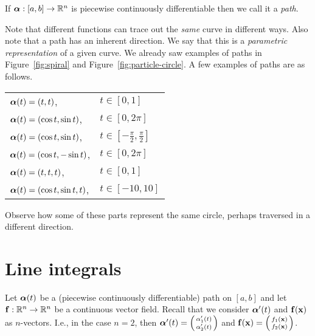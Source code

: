 \begin{definition}%
    \label{def:path}
    If \(\boldsymbol{\alpha}: [a,b] \to \mathbb{R}^n\) is piecewise continuously differentiable then we call it a \emph{path}.
\end{definition}

Note that different functions can trace out the \emph{same} curve in different ways.
Also note that a path has an inherent direction.
We say that this is a \emph{parametric representation} of a given curve.
We already saw examples of paths in Figure~\ref{fig:spiral} and Figure~\ref{fig:particle-circle}.
A few examples of paths are as follows.

\begin{center}
    \begin{tabular}{l l}
        \(\boldsymbol{\alpha}(t)= (t,t)\),              & \(t\in[0,1]\)                           \\
        \(\boldsymbol{\alpha}(t) = (\cos t, \sin t)\),  & \(t\in[0,2\pi]\)                        \\
        \(\boldsymbol{\alpha}(t) = (\cos t, \sin t)\),  & \(t\in [-\frac{\pi}{2},\frac{\pi}{2}]\) \\
        \(\boldsymbol{\alpha}(t) = (\cos t, -\sin t)\), & \(t\in[0,2\pi]\)                        \\
        \(\boldsymbol{\alpha}(t)= (t,t,t)\),            & \(t\in[0,1]\)                           \\
        \(\boldsymbol{\alpha}(t)=(\cos t, \sin t, t)\), & \(t\in [-10,10]\)
    \end{tabular}
\end{center}
\noindent
Observe how some of these parts represent the same circle, perhaps traversed in a different direction.

\section{Line integrals}
Let \(\boldsymbol{\alpha}(t)\) be a (piecewise continuously differentiable) path on \([a,b]\) and
let \(\mathbf{f}: \mathbb{R}^n\to\mathbb{R}^n\) be a continuous vector field.
Recall that we consider \(\boldsymbol{\alpha}'(t)\) and \(\mathbf{f}(\mathbf{x})\) as \(n\)-vectors.
I.e., in the case \(n=2\), then
\(\boldsymbol{\alpha}'(t) = \left(
\begin{smallmatrix}
        \alpha_1'(t) \\ \alpha_2'(t)
    \end{smallmatrix}
\right)\)
and \(\mathbf{f}(\mathbf{x}) = \left(
\begin{smallmatrix}
        f_1(\mathbf{x}) \\ f_2(\mathbf{x})
    \end{smallmatrix}
\right)\).

